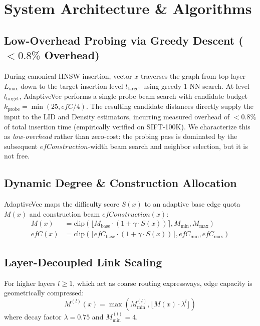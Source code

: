 \documentclass[conference,10pt]{IEEEtran}
\begin{document}
\section{System Architecture \& Algorithms}

\subsection{Low-Overhead Probing via Greedy Descent ($<0.8\%$ Overhead)}
During canonical HNSW insertion, vector $x$ traverses the graph from top layer $L_{\text{max}}$ down to the target insertion level $l_{\text{target}}$ using greedy 1-NN search. At level $l_{\text{target}}$, AdaptiveVec performs a single probe beam search with candidate budget $k_{\text{probe}} = \min(25, efC / 4)$. The resulting candidate distances directly supply the input to the LID and Density estimators, incurring measured overhead of $<0.8\%$ of total insertion time (empirically verified on SIFT-100K). We characterize this as \textit{low-overhead} rather than zero-cost: the probing pass is dominated by the subsequent $efConstruction$-width beam search and neighbor selection, but it is not free.

\subsection{Dynamic Degree \& Construction Allocation}
AdaptiveVec maps the difficulty score $S(x)$ to an adaptive base edge quota $M(x)$ and construction beam $efConstruction(x)$:
\begin{align}
M(x) &= \text{clip}\left( \lfloor M_{\text{base}} \cdot (1 + \gamma \cdot S(x)) \rceil, M_{\text{min}}, M_{\text{max}} \right) \\
efC(x) &= \text{clip}\left( \lfloor efC_{\text{base}} \cdot (1 + \gamma \cdot S(x)) \rceil, efC_{\text{min}}, efC_{\text{max}} \right)
\end{align}

\subsection{Layer-Decoupled Link Scaling}
For higher layers $l \ge 1$, which act as coarse routing expressways, edge capacity is geometrically compressed:
\begin{equation}
M^{(l)}(x) = \max\left( M_{\text{min}}^{(l)}, \lfloor M(x) \cdot \lambda^l \rfloor \right)
\end{equation}
where decay factor $\lambda = 0.75$ and $M_{\text{min}}^{(l)} = 4$.
\end{document}
